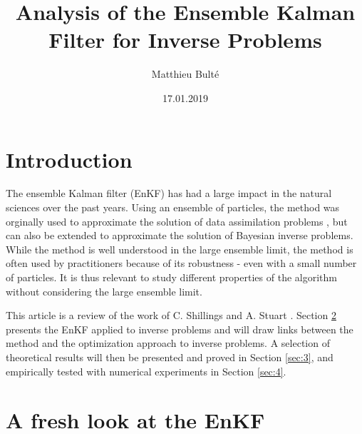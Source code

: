 \documentclass[a4paper,twocolumn,10pt]{article}
\begin{document}
\title{Analysis of the Ensemble Kalman Filter for Inverse Problems}
\author{Matthieu Bulté}
\date{17.01.2019}

\maketitle

\section{Introduction} \label{sec:1} 
The ensemble Kalman filter (EnKF) has had a large impact in the
natural sciences over the past years. Using an ensemble of particles,
the method was orginally used to approximate the solution of data
assimilation problems \cite{iglesias2013ensemble}, but can also be extended to approximate
the solution of Bayesian inverse problems. While the method is well understood
in the large ensemble limit, the method is often used
by practitioners because of its robustness - even with a small number
of particles. It is thus relevant to study different properties of the
algorithm without considering the large ensemble limit.

This article is a review of the work of C. Shillings and A. Stuart \cite{schillings2017analysis}.
Section \ref{sec:2} presents the EnKF applied to inverse problems and will draw links
between the method and the optimization approach to inverse problems. A selection of theoretical
results will then be presented and proved in Section \ref{sec:3}, and empirically tested with numerical
experiments in Section \ref{sec:4}.

\section{A fresh look at the EnKF} \label{sec:2}
\end{document}
